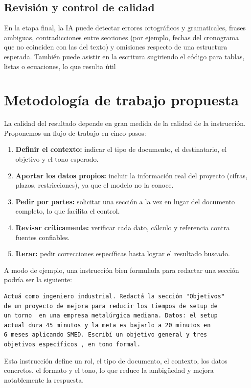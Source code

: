 \documentclass[runningheads]{llncs}
\begin{document}
\subsection{Revisión y control de calidad}

En la etapa final, la IA puede detectar errores ortográficos y gramaticales, frases ambiguas, contradicciones entre secciones (por ejemplo, fechas del cronograma que no coinciden con las del texto) y omisiones respecto de una estructura esperada. También puede asistir en la escritura  sugiriendo el código para tablas, listas o ecuaciones, lo que resulta útil 
\section{Metodología de trabajo propuesta}

La calidad del resultado depende en gran medida de la calidad de la instrucción. Proponemos un flujo de trabajo en cinco pasos:

\begin{enumerate}
\item \textbf{Definir el contexto:} indicar el tipo de documento, el destinatario, el objetivo y el tono esperado.
\item \textbf{Aportar los datos propios:} incluir la información real del proyecto (cifras, plazos, restricciones), ya que el modelo no la conoce.
\item \textbf{Pedir por partes:} solicitar una sección a la vez en lugar del documento completo, lo que facilita el control.
\item \textbf{Revisar críticamente:} verificar cada dato, cálculo y referencia contra fuentes confiables.
\item \textbf{Iterar:} pedir correcciones específicas hasta lograr el resultado buscado.
\end{enumerate}

A modo de ejemplo, una instrucción bien formulada para redactar una sección podría ser la siguiente:

\begin{verbatim}
Actuá como ingeniero industrial. Redactá la sección "Objetivos"
de un proyecto de mejora para reducir los tiempos de setup de
un torno  en una empresa metalúrgica mediana. Datos: el setup
actual dura 45 minutos y la meta es bajarlo a 20 minutos en
6 meses aplicando SMED. Escribí un objetivo general y tres
objetivos específicos , en tono formal.
\end{verbatim}

Esta instrucción define un rol, el tipo de documento, el contexto, los datos concretos, el formato y el tono, lo que reduce la ambigüedad y mejora notablemente la respuesta.
\end{document}
